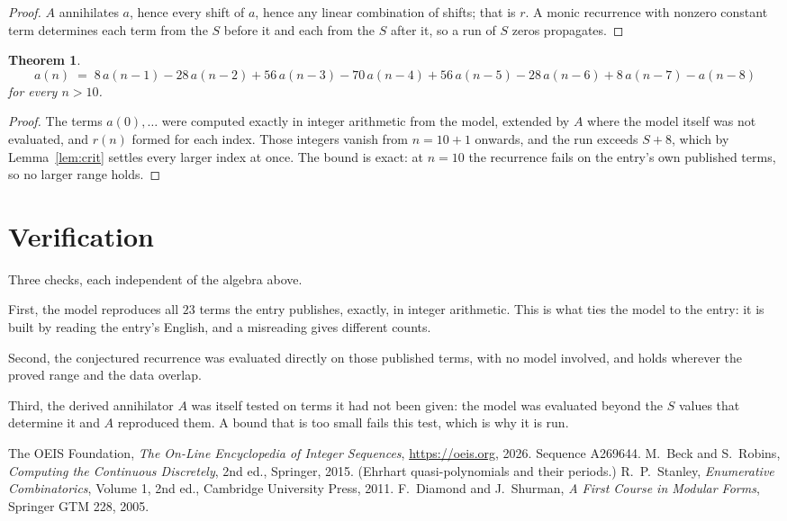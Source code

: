 \documentclass[11pt,a4paper]{article}
\theoremstyle{plain}
\newtheorem{theorem}{Theorem}
\theoremstyle{definition}
\begin{document}
\begin{proof}
$A$ annihilates $a$, hence every shift of $a$, hence any linear combination of shifts; that is
$r$. A monic recurrence with nonzero constant term determines each term from the $S$ before it
and each from the $S$ after it, so a run of $S$ zeros propagates.
\end{proof}

\begin{theorem}
\[
a(n)\;=\;8\,a(n-1) - 28\,a(n-2) + 56\,a(n-3) - 70\,a(n-4) + 56\,a(n-5) - 28\,a(n-6) + 8\,a(n-7) - a(n-8)
\]
for every $n>10$.
\end{theorem}

\begin{proof}
The terms $a(0),\dots$ were computed exactly in integer arithmetic from the model, extended by
$A$ where the model itself was not evaluated, and $r(n)$ formed for each index. Those integers
vanish from $n=10+1$ onwards, and the run exceeds $S+8$, which by
Lemma~\ref{lem:crit} settles every larger index at once. The bound is exact: at $n=10$ the recurrence fails on the entry's own published terms, so no larger range holds.
\end{proof}

\section{Verification}

Three checks, each independent of the algebra above.

First, the model reproduces all $23$ terms the entry publishes, exactly, in integer
arithmetic. This is what ties the model to the entry: it is built by reading the entry's
English, and a misreading gives different counts.

Second, the conjectured recurrence was evaluated directly on those published terms, with no
model involved, and holds wherever the proved range and the data overlap.

Third, the derived annihilator $A$ was itself tested on terms it had not been given: the model
was evaluated beyond the $S$ values that determine it and $A$ reproduced them. A bound that is
too small fails this test, which is why it is run.

\begin{thebibliography}{9}
 The OEIS Foundation, \emph{The On-Line Encyclopedia of Integer
Sequences}, \url{https://oeis.org}, 2026. Sequence A269644.
 M.~Beck and S.~Robins, \emph{Computing the Continuous Discretely},
2nd ed., Springer, 2015. (Ehrhart quasi-polynomials and their periods.)
 R.~P.~Stanley, \emph{Enumerative Combinatorics}, Volume 1, 2nd ed.,
Cambridge University Press, 2011.
 F.~Diamond and J.~Shurman, \emph{A First Course in Modular Forms},
Springer GTM 228, 2005.
\end{thebibliography}
\end{document}
